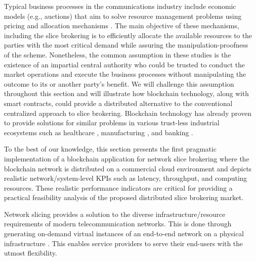Typical business processes in the communications industry include economic models (e.g., auctions) that aim to solve resource management problems using pricing and allocation mechanisms \cite{8480631}. The main objective of these mechanisms, including the slice brokering \cite{8542782} is to efficiently allocate the available resources to the parties with the most critical demand while assuring the manipulation-proofness of the scheme. Nonetheless, the common assumption in these studies is the existence of an impartial central authority who could be trusted to conduct the market operations and execute the business processes without manipulating the outcome to its or another party's benefit. We will challenge this assumption throughout this section and will illustrate how blockchain technology, along with smart contracts, could provide a distributed alternative to the conventional centralized approach to slice brokering. Blockchain technology has already proven to provide solutions for similar problems in various trust-less industrial ecosystems such as healthcare \cite{mettler2016blockchain}, manufacturing \cite{abeyratne2016blockchain}, and banking \cite{guo2016blockchain}.

To the best of our knowledge, this section presents the first pragmatic implementation of a blockchain application for network slice brokering where the blockchain network is distributed on a commercial cloud environment and depicts realistic network/system-level \acp{KPI} such as latency, throughput, and computing resources. These realistic performance indicators are critical for providing a practical feasibility analysis of the proposed distributed slice brokering market.


Network slicing provides a solution to the diverse infrastructure/resource requirements of modern telecommunication networks. This is done through generating on-demand virtual instances of an end-to-end network on a physical infrastructure \cite{santos2018orchestration}. This enables service providers to serve their end-users with the utmost flexibility. 

